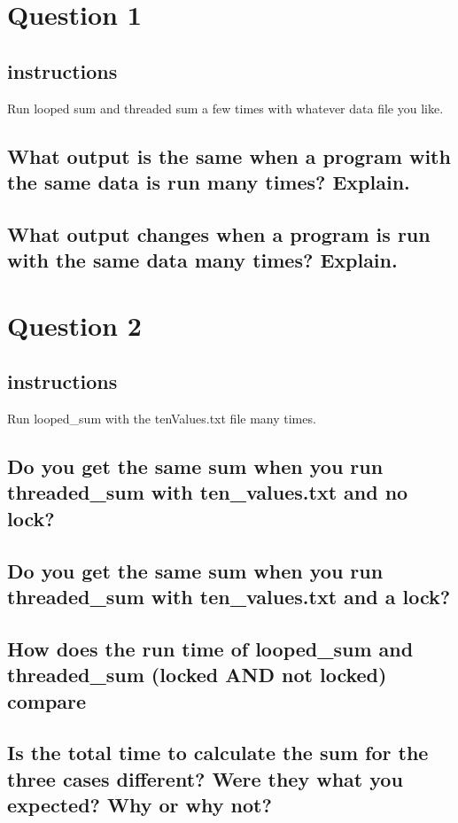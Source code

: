 \documentclass{assignment-x}
\begin{document}
\maketitle
\pagebreak

\section{Question 1}
\subsection{instructions}
Run looped sum and threaded sum a few times with whatever data file you like.
\subsection{What output is the same when a program with the same data is run many times? Explain.}
\subsection{What output changes when a program is run with the same data many times? Explain.}

\section{Question 2}
\subsection{instructions}
Run looped\_sum with the tenValues.txt file many times.
\subsection{Do you get the same sum when you run threaded\_sum with ten\_values.txt and no lock?}
\subsection{Do you get the same sum when you run threaded\_sum with ten\_values.txt and a lock?}
\subsection{How does the run time of looped\_sum and threaded\_sum (locked AND not locked) compare}
\subsection{Is the total time to calculate the sum for the three cases different? Were they what you expected? Why or why not?}
\end{document}
